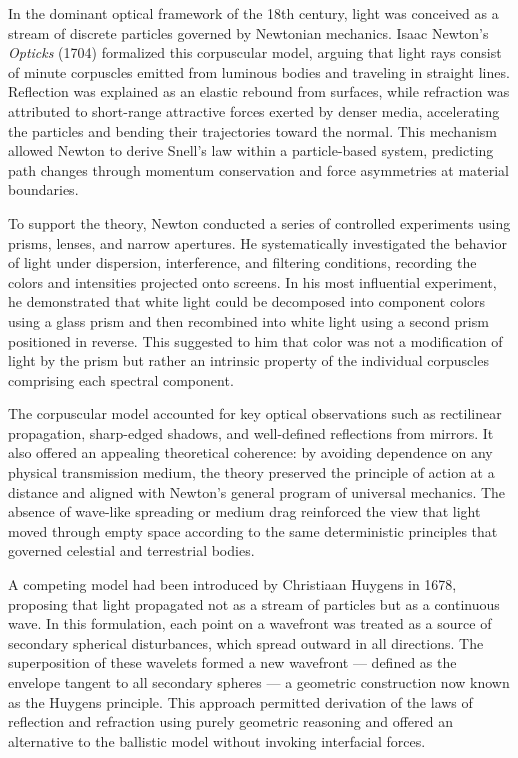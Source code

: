 In the dominant optical framework of the 18th century, light was conceived as a stream of discrete particles governed by Newtonian mechanics. Isaac Newton’s \textit{Opticks} (1704) formalized this corpuscular model, arguing that light rays consist of minute corpuscles emitted from luminous bodies and traveling in straight lines. Reflection was explained as an elastic rebound from surfaces, while refraction was attributed to short-range attractive forces exerted by denser media, accelerating the particles and bending their trajectories toward the normal. This mechanism allowed Newton to derive Snell’s law within a particle-based system, predicting path changes through momentum conservation and force asymmetries at material boundaries.

To support the theory, Newton conducted a series of controlled experiments using prisms, lenses, and narrow apertures. He systematically investigated the behavior of light under dispersion, interference, and filtering conditions, recording the colors and intensities projected onto screens. In his most influential experiment, he demonstrated that white light could be decomposed into component colors using a glass prism and then recombined into white light using a second prism positioned in reverse. This suggested to him that color was not a modification of light by the prism but rather an intrinsic property of the individual corpuscles comprising each spectral component.

The corpuscular model accounted for key optical observations such as rectilinear propagation, sharp-edged shadows, and well-defined reflections from mirrors. It also offered an appealing theoretical coherence: by avoiding dependence on any physical transmission medium, the theory preserved the principle of action at a distance and aligned with Newton’s general program of universal mechanics. The absence of wave-like spreading or medium drag reinforced the view that light moved through empty space according to the same deterministic principles that governed celestial and terrestrial bodies.

A competing model had been introduced by Christiaan Huygens in 1678, proposing that light propagated not as a stream of particles but as a continuous wave. In this formulation, each point on a wavefront was treated as a source of secondary spherical disturbances, which spread outward in all directions. The superposition of these wavelets formed a new wavefront — defined as the envelope tangent to all secondary spheres — a geometric construction now known as the Huygens principle. This approach permitted derivation of the laws of reflection and refraction using purely geometric reasoning and offered an alternative to the ballistic model without invoking interfacial forces.

